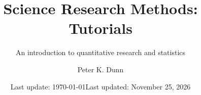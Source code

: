 \documentclass[
  11pt,
  a4paper,
  krantz2]{krantz}
\author{}
\date{\vspace{-2.5em}Last update: \today}
\title{Science Research Methods: Tutorials}
\subtitle{An introduction to quantitative research and statistics}
\author{Peter K. Dunn}
\date{Last updated: November 25, 2026}
\makeatletter
\renewenvironment{quote}%
{\begin{kframe}}
{\end{kframe}}
\newenvironment{kframe}{%
\medskip{}
\setlength{\fboxsep}{.8em}
 \def\at@end@of@kframe{}%
 \ifinner\ifhmode%
  \def\at@end@of@kframe{\end{minipage}}%
  \begin{minipage}{\columnwidth}%
 \fi\fi%
 \def\FrameCommand##1{\hskip\@totalleftmargin \hskip-\fboxsep
 \colorbox{shadecolor}{##1}\hskip-\fboxsep
     \hskip-\linewidth \hskip-\@totalleftmargin \hskip\columnwidth}%
 \MakeFramed {\advance\hsize-\width
   \@totalleftmargin\z@ \linewidth\hsize
   \@setminipage}}%
 {\par\unskip\endMakeFramed%
 \at@end@of@kframe}
\renewenvironment{quote}
               {\list{}{\vspace{-0.5em}\begin{kframe}\small%
                        \rightmargin   \leftmargin
                        \parsep        \z@ \@plus\p@}%
                \item\relax}
               {\end{kframe}\endlist}
\let\oldmaketitle\maketitle
\makeatother
\begin{document}
\maketitle



\thispagestyle{empty}




\let\maketitle\oldmaketitle


\setlength{\abovedisplayskip}{-5pt}
\setlength{\abovedisplayshortskip}{-5pt}




\let\origexample=\example
\def\example{\begingroup\begin{quote}\setlength{\parskip}{3mm}\vspace{-7mm}\origexample}  
\let\origendexample=\endexample
\def\endexample{\origendexample\end{quote}\endgroup}


\let\origdefinition=\definition
\def\definition{\begingroup\begin{quote}\vspace{-5mm}\origdefinition}  
\let\origenddefinition=\enddefinition
\def\enddefinition{\origenddefinition\end{quote}\endgroup}
\end{document}
